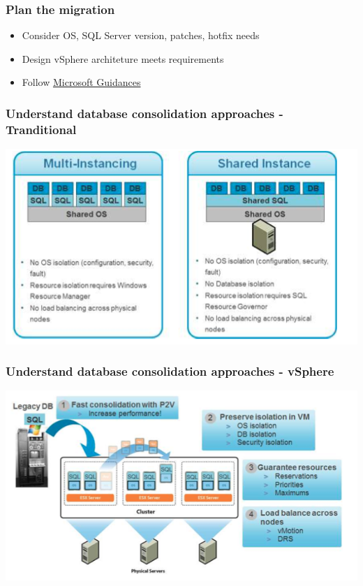 \documentclass[CJK]{beamer}
\begin{document}
\begin{frame}[t]
    \frametitle{Plan the migration}
    \begin{itemize}
        \item Consider OS, SQL Server version, patches, hotfix needs
        \item Design vSphere architeture meets requirements
        \item Follow \href{http://technet.microsoft.com/en-us/sqlserver/jj901640}{Microsoft Guidances}
    \end{itemize}
\end{frame}

\begin{frame}[t]
    \frametitle{Understand database consolidation approaches - Tranditional}
        \includegraphics[width=\textwidth]{"sqlserver_consolidation_tran.png"}
\end{frame}

\begin{frame}[t]
    \frametitle{Understand database consolidation approaches - vSphere}
        \includegraphics[width=\textwidth]{"sqlserver_consolidation_vsphere.png"}
\end{frame}
\end{document}

